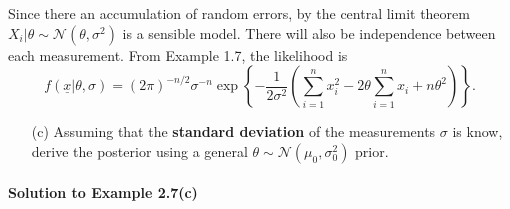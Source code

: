 {{    Since there an accumulation of random errors, by the central limit theorem $X_i|\theta\sim\mathcal{N}(\theta, \sigma^2)$ is a sensible model. There will also be independence between each measurement. From Example 1.7, the likelihood is
    $$ f(\underline{x}|\theta,\sigma) =  (2\pi)^{-n/2}\sigma^{-n}
        \exp\left\{-\frac{1}{2\sigma^2}
        \left(\sum_{i=1}^n x_i^2-2\theta\sum_{i=1}^n x_i+n\theta^2\right)\right\}.$$
        
    
    
}

\clearpage

\begin{itemize}
\item [(c)] Assuming that the \textbf{\color{darkblue}standard deviation} of the measurements $\sigma$ is know, derive the posterior using a general $\theta \sim \mathcal{N}(\mu_0, \sigma^2_0)$ prior.
\end{itemize}
\paragraph{Solution to Example 2.7(c)}{
    
}}
